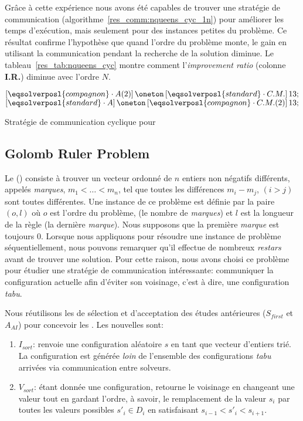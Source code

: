 Grâce à cette expérience nous avons été capables de trouver une stratégie de communication (algorithme~\ref{res_comm:nqueens_cyc_1n}) pour améliorer les temps d'exécution, mais seulement pour des instances petites du problème. Ce résultat confirme l'hypothèse que quand l'ordre du problème monte, le gain en utilisant la communication pendant la recherche de la solution diminue. Le tableau~\ref{res_tab:nqueens_cyc} montre comment l'\textit{improvement ratio} (colonne \textbf{I.R.}) diminue avec l'ordre $N$. 

\begin{algorithm}[!h]
\dontprintsemicolon
\SetNoline
$\left[\eqsolverposl{compagnon}\cdot A(2)\right] \oneton \left[\eqsolverposl{standard}\cdot C.M.\right]13;$\;
$\left[\eqsolverposl{standard}\cdot A\right] \oneton \left[\eqsolverposl{compagnon}\cdot C.M.(2)\right]13;$
\caption{Stratégie de communication cyclique \oneTn{} pour \NQP}\label{res_comm:nqueens_cyc_1n}
\end{algorithm}




\subsection{Golomb Ruler Problem}

Le \grp{} (\GRP) consiste à trouver un vecteur ordonné de $n$ entiers non négatifs différents, appelés \textit{marques}, $m_1<\dots<m_n$, tel que toutes les différences $m_i- m_j$, $(i>j)$ sont toutes différentes. Une instance de ce problème est définie par la paire $(o,l)$ où $o$ est l'ordre du problème, (le nombre de \textit{marques}) et  $l$ est la longueur de la règle (la dernière {\it marque}). Nous supposons que la première \textit{marque} est toujours 0. Lorsque nous appliquons \posl{} pour résoudre une instance de problème séquentiellement, nous pouvons remarquer qu'il effectue de nombreux {\it restars} avant de trouver une solution. Pour cette raison, nous avons choisi ce problème pour étudier une stratégie de communication intéressante: communiquer la configuration actuelle afin d'éviter son voisinage, c'est à dire, une configuration {\it tabu}.

Nous réutilisons les \ms{} de sélection et d'acceptation des études antérieures ($S_{first}$ et$A_{AI}$) pour concevoir les \ass. Les nouvelles \ms{} sont:
\begin{enumerate}
\item $I_{sort}$: renvoie une configuration aléatoire $s$ en tant que vecteur d'entiers trié. La configuration est générée \textit{loin} de l'ensemble des configurations {\it tabu} arrivées via communication entre solveurs.
\item $V_{sort}$: étant donnée une configuration, retourne le voisinage en changeant une valeur tout en gardant l'ordre, à savoir, le remplacement de la valeur $s_i$ par toutes les valeurs possibles $s'_i \in D_i$ en satisfaisant $s_{i-1}< s'_i < s_{i+1}$.
\end{enumerate}

